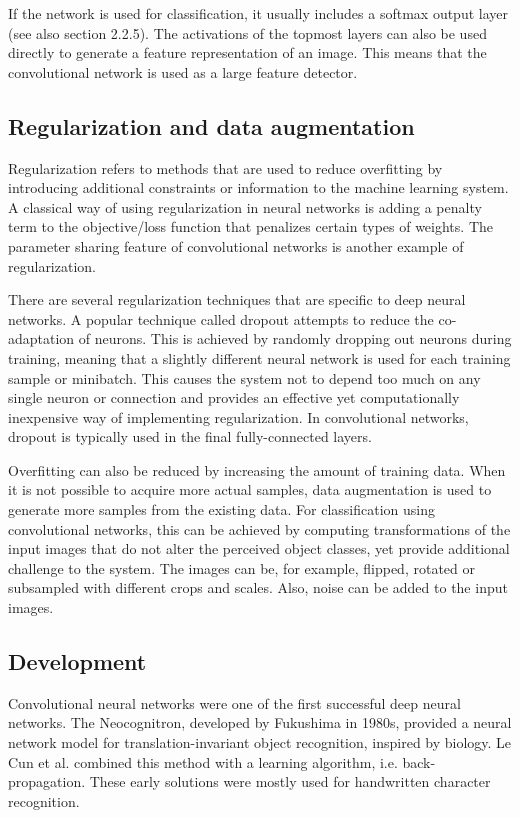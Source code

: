 If the network is used for classification, it usually includes a softmax output layer (see also section 2.2.5). The activations of the topmost layers can also be used directly to generate a feature representation of an image. This means that the convolutional network is used as a large feature detector.

\subsection{Regularization and data augmentation}
Regularization refers to methods that are used to reduce overfitting by introducing additional constraints or information to the machine learning system. A classical way of using regularization in neural networks is adding a penalty term to the objective/loss function that penalizes certain types of weights. The parameter sharing feature of convolutional networks is another example of regularization.

There are several regularization techniques that are specific to deep neural networks. A popular technique called dropout attempts to reduce the co-adaptation of neurons. This is achieved by randomly dropping out neurons during training, meaning that a slightly different neural network is used for each training sample or minibatch. This causes the system not to depend too much on any single neuron or connection and provides an effective yet computationally inexpensive way of implementing regularization. In convolutional networks, dropout is typically used in the final fully-connected layers.

Overfitting can also be reduced by increasing the amount of training data. When it is not possible to acquire more actual samples, data augmentation is used to generate more samples from the existing data. For classification using convolutional networks, this can be achieved by computing transformations of the input images that do not alter the perceived object classes, yet provide additional challenge to the system. The images can be, for example, flipped, rotated or subsampled with different crops and scales. Also, noise can be added to the input images.

\subsection{Development}
Convolutional neural networks were one of the first successful deep neural networks. The Neocognitron, developed by Fukushima in 1980s, provided a neural network model for translation-invariant object recognition, inspired by biology. Le Cun et al. combined this method with a learning algorithm, i.e. back-propagation. These early solutions were mostly used for handwritten character recognition.

